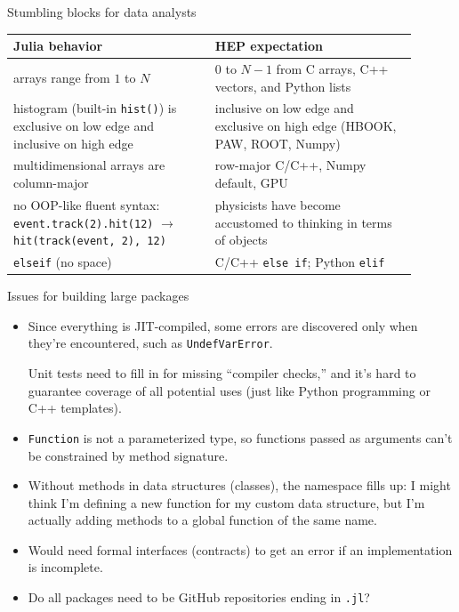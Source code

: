 \documentclass{beamer}
\begin{document}
\begin{frame}{Stumbling blocks for data analysts}
\vspace{0.4 cm}
\renewcommand{\arraystretch}{1.2}
\begin{tabular}{>{\raggedright}p{0.45\linewidth} >{\raggedright\arraybackslash}p{0.45\linewidth}}
{\bf Julia behavior} & {\bf HEP expectation} \\\hline
arrays range from $1$ to $N$ & $0$ to $N-1$ from C arrays, C++ vectors, and Python lists \\\hline
histogram (built-in {\tt \scriptsize hist()}) is exclusive on low edge and inclusive on high edge & inclusive on low edge and exclusive on high edge (HBOOK, PAW, ROOT, Numpy) \\\hline
multidimensional arrays are column-major & row-major C/C++, Numpy default, GPU \\\hline
no OOP-like fluent syntax: {\tt \scriptsize event.track(2).hit(12)} $\to$ {\tt \scriptsize hit(track(event, 2), 12)} & physicists have become accustomed to thinking in terms of objects \\\hline
{\tt \scriptsize elseif} (no space) & C/C++ {\tt \scriptsize else if}; Python {\tt \scriptsize elif}
\end{tabular}
\end{frame}

\begin{frame}{Issues for building large packages}
\vspace{0.4 cm}
\begin{itemize}
  \item Since everything is JIT-compiled, some errors are discovered only when they're encountered, such as {\tt \small UndefVarError}.

\vspace{0.2 cm}
Unit tests need to fill in for missing ``compiler checks,'' and it's hard to guarantee coverage of all potential uses (just like Python programming or C++ templates).

  \item {\tt \small Function} is not a parameterized type, so functions passed as arguments can't be constrained by method signature.

  \item Without methods in data structures (classes), the namespace fills up: I might think I'm defining a new function for my custom data structure, but I'm actually adding methods to a global function of the same name.

  \item Would need formal interfaces (contracts) to get an error if an implementation is incomplete.

  \item Do all packages need to be GitHub repositories ending in {\tt \small .jl}?
\end{itemize}
\end{frame}
\end{document}
